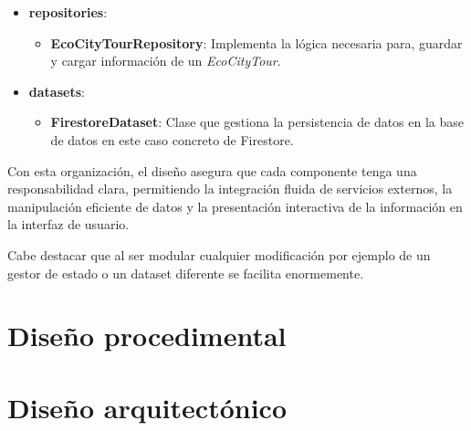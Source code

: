\begin{itemize}
	\item \textbf{repositories}:
	\begin{itemize}
		\item \textbf{EcoCityTourRepository}: Implementa la lógica necesaria para, guardar y cargar información de un \textit{EcoCityTour}.
	\end{itemize}
	
	\item \textbf{datasets}:
	\begin{itemize}
		\item \textbf{FirestoreDataset}: Clase que gestiona la persistencia de datos en la base de datos en este caso concreto de Firestore.
	\end{itemize}
\end{itemize}

Con esta organización, el diseño asegura que cada componente tenga una responsabilidad clara, permitiendo la integración fluida de servicios externos, la manipulación eficiente de datos y la presentación interactiva de la información en la interfaz de usuario. 

Cabe destacar que al ser modular cualquier modificación por ejemplo de un gestor de estado o un dataset diferente se facilita enormemente.



\section{Diseño procedimental}

\section{Diseño arquitectónico}


